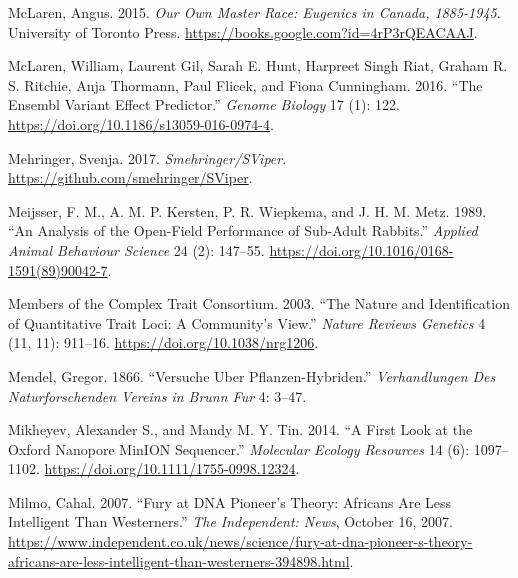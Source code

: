 \documentclass[
]{book}
\newlength{\cslhangindent}
\newlength{\cslentryspacingunit} %
\newenvironment{CSLReferences}[2] %
 {%
  \setlength{\parindent}{0pt}
  \ifodd #1
  \let\oldpar\par
  \def\par{\hangindent=\cslhangindent\oldpar}
  \fi
  \setlength{\parskip}{#2\cslentryspacingunit}
 }%
 {}
\begin{document}
\begin{CSLReferences}{1}{0}
\leavevmode{}%
McLaren, Angus. 2015. \emph{Our {Own Master Race}: {Eugenics} in {Canada}, 1885-1945}. {University of Toronto Press}. \url{https://books.google.com?id=4rP3rQEACAAJ}.

\leavevmode{}%
McLaren, William, Laurent Gil, Sarah E. Hunt, Harpreet Singh Riat, Graham R. S. Ritchie, Anja Thormann, Paul Flicek, and Fiona Cunningham. 2016. {``The {Ensembl Variant Effect Predictor}.''} \emph{Genome Biology} 17 (1): 122. \url{https://doi.org/10.1186/s13059-016-0974-4}.

\leavevmode{}%
Mehringer, Svenja. 2017. \emph{Smehringer/{SViper}}. \url{https://github.com/smehringer/SViper}.

\leavevmode{}%
Meijsser, F. M., A. M. P. Kersten, P. R. Wiepkema, and J. H. M. Metz. 1989. {``An Analysis of the Open-Field Performance of Sub-Adult Rabbits.''} \emph{Applied Animal Behaviour Science} 24 (2): 147--55. \url{https://doi.org/10.1016/0168-1591(89)90042-7}.

\leavevmode{}%
Members of the Complex Trait Consortium. 2003. {``The Nature and Identification of Quantitative Trait Loci: A Community's View.''} \emph{Nature Reviews Genetics} 4 (11, 11): 911--16. \url{https://doi.org/10.1038/nrg1206}.

\leavevmode{}%
Mendel, Gregor. 1866. {``Versuche Uber Pflanzen-Hybriden.''} \emph{Verhandlungen Des Naturforschenden Vereins in Brunn Fur} 4: 3--47.

\leavevmode{}%
Mikheyev, Alexander S., and Mandy M. Y. Tin. 2014. {``A First Look at the {Oxford Nanopore MinION} Sequencer.''} \emph{Molecular Ecology Resources} 14 (6): 1097--1102. \url{https://doi.org/10.1111/1755-0998.12324}.

\leavevmode{}%
Milmo, Cahal. 2007. {``Fury at {DNA} Pioneer's Theory: {Africans} Are Less Intelligent Than {Westerners}.''} \emph{The Independent: News}, October 16, 2007. \url{https://www.independent.co.uk/news/science/fury-at-dna-pioneer-s-theory-africans-are-less-intelligent-than-westerners-394898.html}.


\end{CSLReferences}
\end{document}
